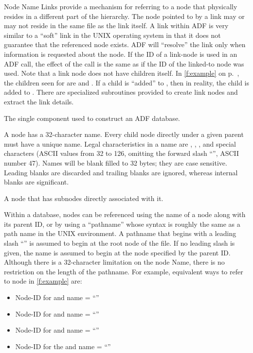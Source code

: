 \begin{Ventryi}{Node Name}
      Links provide a mechanism for referring to a node that physically
      resides in a different part of the hierarchy.
      The node pointed to by a link may or may not reside in the same
      file as the link itself.
      A link within ADF is very similar to a ``soft'' link in the
      UNIX operating system in that it does not guarantee that the
      referenced node exists.
      ADF will ``resolve'' the link only when information is requested
      about the node.
      If the ID of a link-node is used in an ADF call, the effect of
      the call is the same as if the ID of the linked-to node was used.
      Note that a link node does not have children itself.
      In \autoref{f:example} on p.~\pageref*{f:example}, the children
      seen for  are  and .
      If a child is ``added'' to , then in reality, the child
      is added to .
      There are specialized subroutines provided to create link nodes
      and extract the link details.
\item [Node]
      The single component used to construct an ADF database.
\item [Node name]
      A node has a 32-character name.
      Every child node directly under a given parent must have a unique
      name.
      Legal characteristics in a name are , ,
      , and special characters (ASCII values from 32 to
      126, omitting the forward slash ``\fort{/}'', ASCII number 47).
      Names will be blank filled to 32 bytes; they are case sensitive.
      Leading blanks are discarded and trailing blanks are ignored,
      whereas internal blanks are significant.
\item [Parent]
      A node that has subnodes directly associated with it.
\item [Pathname]
      Within a database, nodes can be referenced using the name of a node
      along with its parent ID, or by using a ``pathname'' whose syntax is
      roughly the same as a path name in the UNIX environment.
      A pathname that begins with a leading slash ``\fort{/}'' is
      assumed to begin at the root node of the file.
      If no leading slash is given, the name is assumed to begin at the
      node specified by the parent ID.
      Although there is a 32-character limitation on the node Name,
      there is no restriction on the length of the pathname.
      For example, equivalent ways to refer to node  in
      \autoref{f:example} are:
      \begin{itemize}
      \item Node-ID for  and name = ``''
      \item Node-ID for  and name = ``''
      \item Node-ID for  and name = ``''
      \item Node-ID for the  and name =
            ``''
      \end{itemize}
\end{Ventryi}
